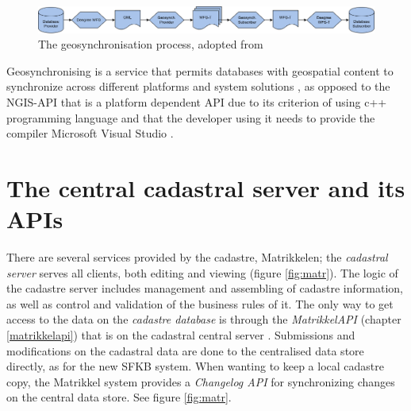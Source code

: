 \begin{figure}[H]
	\centering
	\includegraphics[scale=0.4]{img/geosynkkk.png}
	\caption{The geosynchronisation process, adopted from \cite{Eggan2017} }
	\label{fig:geosyncprocess}
\end{figure}

Geosynchronising is a service that permits databases with geospatial content to synchronize across different platforms and system solutions \citep{Kartverket2013}, as opposed to the NGIS-API that is a platform dependent API due to its criterion of using c++ programming language and that the developer using it needs to provide the compiler Microsoft Visual Studio \citep{Kartverket2017b, Norkart2011}.

\section{The central cadastral server and its APIs}
There are several services provided by the cadastre, Matrikkelen; the \textit{cadastral server} serves all clients, both editing and viewing (figure \ref{fig:matr}). The logic of the cadastre server includes management and assembling of cadastre information, as well as control and validation of the business rules of it. The only way to get access to the data on the \textit{cadastre database} is through the \textit{MatrikkelAPI} (chapter \ref{matrikkelapi}) that is on the cadastral central server \citep[p.~338]{Matrikkelavdelingen2017}. Submissions and modifications on the cadastral data are done to the centralised data store directly, as for the new SFKB system. When wanting to keep a local cadastre copy, the Matrikkel system provides a \textit{Changelog API} for synchronizing changes on the central data store. See figure \ref{fig:matr}. 

